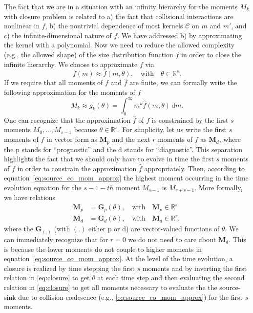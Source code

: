 \documentclass{report}
\begin{document}
The fact that we are in a situation with an infinity hierarchy for the moments $M_k$ with closure problem is related to a) the fact that collisional interactions are nonlinear in $f$, b) the nontrivial dependence of most kernels $\mathcal{C}$ on $m$ and $m'$, and c) the infinite-dimensional nature of $f$. We have addressed b) by approximating the kernel with a polynomial. Now we need to reduce the allowed complexity (e.g., the allowed shape) of the size distribution function $f$ in order to close the infinite hierarchy. We choose to approximate $f$ via
\begin{equation}
    f(m) \approx \hat{f}(m, \theta), \quad \text{with} \quad \theta \in \mathbb{R}^{s}.
\end{equation}
If we require that all moments of $f$ and $\hat{f}$ are finite, we can formally write the following approximation for the moments of $f$
\begin{equation}
    M_k \approx g_k(\theta) = \int_0^\infty m^k\hat{f}(m, \theta) \, \text{d}m.
\end{equation}
One can recognize that the approximation $\hat{f}$ of $f$ is constrained by the first $s$ moments $M_0, \dots, M_{s-1}$ because $\theta \in \mathbb{R}^s$. For simplicity, let us write the first $s$ moments of $f$ in vector form as $\mathbf{M}_p$ and the next $r$ moments of $f$ as $\mathbf{M}_d$, where the p stands for ``prognostic'' and the d stands for ``diagnostic''. This separation highlights the fact that we should only have to evolve in time the first $s$ moments of $f$ in order to constrain the approximation $\hat{f}$ appropriately. Then, according to equation~\eqref{eq:source_co_mom_approx} the highest moment occurring in the time evolution equation for the $s-1-th$ moment $M_{s-1}$ is $M_{r+s-1}$. More formally, we have relations
\begin{subequations}\label{eq:closure}
\begin{align}
    \mathbf{M}_p &= \mathbf{G}_p(\theta), \quad \text{with} \quad \mathbf{M}_p \in \mathbb{R}^s \\
    \mathbf{M}_d &= \mathbf{G}_d(\theta), \quad \text{with} \quad \mathbf{M}_d \in \mathbb{R}^r,
\end{align}
\end{subequations}
where the $\mathbf{G}_{(.)}$ (with $(.)$ either p or d) are vector-valued functions of $\theta$. We can immediately recognize that for $r = 0$ we do not need to care about $\mathbf{M}_d$. This is because the lower moments do not couple to higher moments in equation~\eqref{eq:source_co_mom_approx}. At the level of the time evolution, a closure is realized by time stepping the first $s$ moments and by inverting the first relation in \eqref{eq:closure} to get $\theta$ at each time step and then evaluating the second relation in \eqref{eq:closure} to get all moments necessary to evaluate the the source-sink due to collision-coalesence (e.g., \eqref{eq:source_co_mom_approx}) for the first $s$ moments.
\end{document}
